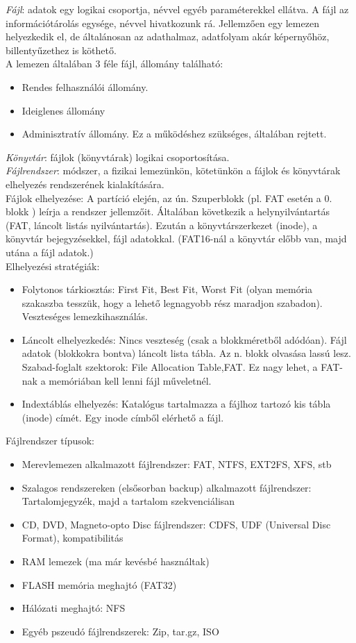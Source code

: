 \documentclass[margin=0px]{article}
\begin{document}
\textit{Fájl}: adatok egy logikai csoportja, névvel egyéb paraméterekkel ellátva. A fájl az információtárolás egysége, névvel hivatkozunk rá. Jellemzően egy lemezen helyezkedik el, de általánosan az adathalmaz, adatfolyam akár képernyőhöz, billentyűzethez is köthető. \\
A lemezen általában 3 féle fájl, állomány található:
\begin{itemize}
    \item Rendes felhasználói állomány.
    \item Ideiglenes állomány
    \item Adminisztratív állomány. Ez a működéshez szükséges, általában rejtett.
\end{itemize}
\textit{Könyvtár}: fájlok (könyvtárak) logikai csoportosítása. \\
\textit{Fájlrendszer}: módszer, a fizikai lemezünkön, kötetünkön a fájlok és könyvtárak elhelyezés rendszerének kialakítására. \\
Fájlok elhelyezése: A partíció elején, az ún. Szuperblokk (pl. FAT esetén a 0. blokk ) leírja a rendszer jellemzőit. Általában következik a helynyilvántartás (FAT, láncolt listás nyilvántartás). Ezután a könyvtárszerkezet (inode), a könyvtár bejegyzésekkel, fájl adatokkal. (FAT16-nál a könyvtár előbb van, majd utána a fájl adatok.) \\
Elhelyezési stratégiák:
\begin{itemize}
    \item Folytonos tárkiosztás: First Fit, Best Fit, Worst Fit (olyan memória szakaszba tesszük, hogy a lehető legnagyobb rész maradjon szabadon). Veszteséges lemezkihasználás.
    \item Láncolt elhelyezkedés: Nincs veszteség (csak a blokkméretből adódóan). Fájl adatok (blokkokra bontva) láncolt lista tábla. Az n. blokk olvasása lassú lesz. Szabad-foglalt szektorok: File Allocation Table,FAT. Ez nagy lehet, a FAT-nak a memóriában kell lenni fájl műveletnél.
    \item Indextáblás elhelyezés: Katalógus tartalmazza a fájlhoz tartozó kis tábla (inode) címét. Egy inode címből elérhető a fájl.
\end{itemize}

Fájlrendszer típusok:
\begin{itemize}
    \item Merevlemezen alkalmazott fájlrendszer: FAT, NTFS, EXT2FS, XFS, stb
    \item Szalagos rendszereken (elsősorban backup) alkalmazott fájlrendszer: Tartalomjegyzék, majd a tartalom szekvenciálisan
    \item CD, DVD, Magneto-opto Disc fájlrendszer: CDFS, UDF (Universal Disc Format), kompatibilitás
    \item RAM lemezek (ma már kevésbé használtak)
    \item FLASH memória meghajtó (FAT32)
    \item Hálózati meghajtó: NFS
    \item Egyéb pszeudó fájlrendszerek: Zip, tar.gz, ISO
\end{itemize}
\end{document}
